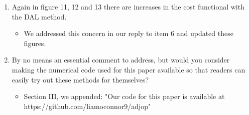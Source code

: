 \documentclass[%
 letter,
 amsmath,amssymb,
]{revtex4-2}
\begin{document}
\begin{enumerate}
\begin{itemize}
\end{itemize}\color{black}\item Again in figure 11, 12 and 13 there are increases in the cost functional with the DAL method.  \\
\color{blue}\begin{itemize}
  
\item We addressed this concern in our reply to item 6 and updated these figures.

\end{itemize}\color{black}\item By no means an essential comment to address, but would you  consider making the numerical code used for this paper available so  that readers can easily try out these methods for themselves?  \\
\color{blue}\begin{itemize}

\item Section III, we appended: "Our code for this paper is available at https://github.com/liamoconnor9/adjop"
\end{itemize}
\end{enumerate}
\end{document}
